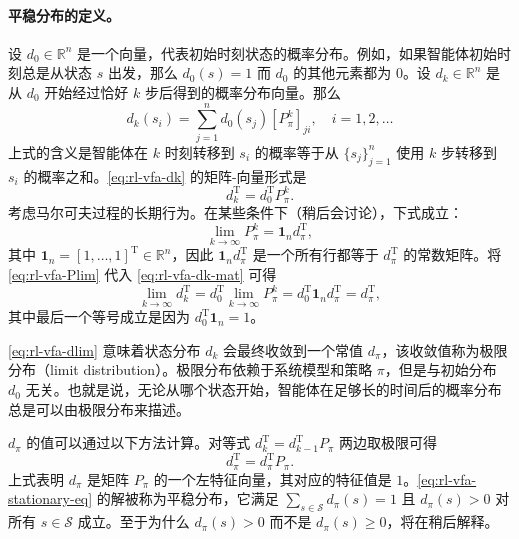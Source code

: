 \begin{note}[方框 8.1：马尔可夫决策过程的平稳分布]
\paragraph{平稳分布的定义。}设 $d_0 \in \mathbb{R}^n$ 是一个向量，代表初始时刻状态的概率分布。例如，如果智能体初始时刻总是从状态 $s$ 出发，那么 $d_0(s) = 1$ 而 $d_0$ 的其他元素都为 $0$。设 $d_k \in \mathbb{R}^n$ 是从 $d_0$ 开始经过恰好 $k$ 步后得到的概率分布向量。那么
\begin{equation}
d_{k}(s_{i}) = \sum_{j=1}^{n} d_{0}(s_{j}) [P_{\pi}^{k}]_{ji}, \quad i = 1, 2, \dots
\label{eq:rl-vfa-dk}
\end{equation}
上式的含义是智能体在 $k$ 时刻转移到 $s_i$ 的概率等于从 $\{s_j\}_{j=1}^n$ 使用 $k$ 步转移到 $s_i$ 的概率之和。\cref{eq:rl-vfa-dk} 的矩阵-向量形式是
\begin{equation}
d_{k}^{\mathrm{T}} = d_{0}^{\mathrm{T}} P_{\pi}^{k}.
\label{eq:rl-vfa-dk-mat}
\end{equation}
考虑马尔可夫过程的长期行为。在某些条件下（稍后会讨论），下式成立：
\begin{equation}
\lim_{k \to \infty} P_{\pi}^{k} = \mathbf{1}_{n} d_{\pi}^{\mathrm{T}},
\label{eq:rl-vfa-Plim}
\end{equation}
其中 $\mathbf{1}_n = [1,\dots,1]^{\mathrm{T}}\in \mathbb{R}^n$，因此 $\mathbf{1}_n d_\pi^{\mathrm{T}}$ 是一个所有行都等于 $d_{\pi}^{\mathrm{T}}$ 的常数矩阵。将 \cref{eq:rl-vfa-Plim} 代入 \cref{eq:rl-vfa-dk-mat} 可得
\begin{equation}
\lim_{k \to \infty} d_{k}^{\mathrm{T}} = d_{0}^{\mathrm{T}} \lim_{k \to \infty} P_{\pi}^{k} = d_{0}^{\mathrm{T}} \mathbf{1}_{n} d_{\pi}^{\mathrm{T}} = d_{\pi}^{\mathrm{T}},
\label{eq:rl-vfa-dlim}
\end{equation}
其中最后一个等号成立是因为 $d_0^{\mathrm{T}}\mathbf{1}_n = 1$。

\cref{eq:rl-vfa-dlim} 意味着状态分布 $d_{k}$ 会最终收敛到一个常值 $d_{\pi}$，该收敛值称为极限分布（limit distribution）。极限分布依赖于系统模型和策略 $\pi$，但是与初始分布 $d_{0}$ 无关。也就是说，无论从哪个状态开始，智能体在足够长的时间后的概率分布总是可以由极限分布来描述。

$d_{\pi}$ 的值可以通过以下方法计算。对等式 $d_k^{\mathrm{T}} = d_{k-1}^{\mathrm{T}}P_{\pi}$ 两边取极限可得
\begin{equation}
d_{\pi}^{\mathrm{T}} = d_{\pi}^{\mathrm{T}} P_{\pi}.
\label{eq:rl-vfa-stationary-eq}
\end{equation}
上式表明 $d_{\pi}$ 是矩阵 $P_{\pi}$ 的一个左特征向量，其对应的特征值是 $1$。\cref{eq:rl-vfa-stationary-eq} 的解被称为平稳分布，它满足 $\sum_{s\in \mathcal{S}}d_{\pi}(s) = 1$ 且 $d_{\pi}(s) > 0$ 对所有 $s\in \mathcal{S}$ 成立。至于为什么 $d_{\pi}(s) > 0$ 而不是 $d_{\pi}(s)\geqslant 0$，将在稍后解释。


\end{note}
